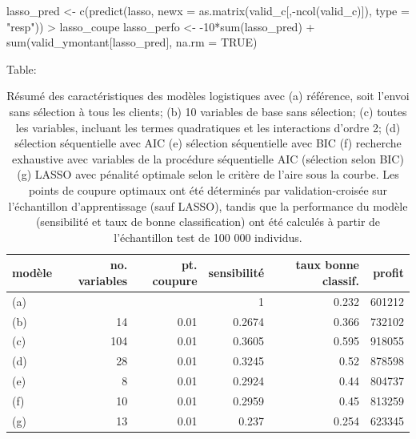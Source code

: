 \documentclass[
  11pt,
  letterpaper,
]{scrbook}
\newenvironment{Shaded}{\begin{snugshade}}{\end{snugshade}}
\newcommand{\AttributeTok}[1]{\textcolor[rgb]{0.40,0.45,0.13}{#1}}
\newcommand{\ConstantTok}[1]{\textcolor[rgb]{0.56,0.35,0.01}{#1}}
\newcommand{\DecValTok}[1]{\textcolor[rgb]{0.68,0.00,0.00}{#1}}
\newcommand{\FunctionTok}[1]{\textcolor[rgb]{0.28,0.35,0.67}{#1}}
\newcommand{\NormalTok}[1]{\textcolor[rgb]{0.00,0.23,0.31}{#1}}
\newcommand{\OtherTok}[1]{\textcolor[rgb]{0.00,0.23,0.31}{#1}}
\newcommand{\SpecialCharTok}[1]{\textcolor[rgb]{0.37,0.37,0.37}{#1}}
\newcommand{\StringTok}[1]{\textcolor[rgb]{0.13,0.47,0.30}{#1}}
\theoremstyle{definition}
\theoremstyle{remark}
\begin{document}
\begin{Shaded}
\begin{Highlighting}[]
\NormalTok{lasso\_pred }\OtherTok{\textless{}{-}} \FunctionTok{c}\NormalTok{(}\FunctionTok{predict}\NormalTok{(lasso, }
        \AttributeTok{newx =} \FunctionTok{as.matrix}\NormalTok{(valid\_c[,}\SpecialCharTok{{-}}\FunctionTok{ncol}\NormalTok{(valid\_c)]), }
        \AttributeTok{type =} \StringTok{"resp"}\NormalTok{)) }\SpecialCharTok{\textgreater{}}\NormalTok{ lasso\_coupe}
\NormalTok{lasso\_perfo }\OtherTok{\textless{}{-}} \SpecialCharTok{{-}}\DecValTok{10}\SpecialCharTok{*}\FunctionTok{sum}\NormalTok{(lasso\_pred) }\SpecialCharTok{+} 
  \FunctionTok{sum}\NormalTok{(valid\_ymontant[lasso\_pred], }\AttributeTok{na.rm =} \ConstantTok{TRUE}\NormalTok{)}
\end{Highlighting}
\end{Shaded}

Table:

\hypertarget{tbl-03-summarylog}{}
\begin{table}
\caption{\label{tbl-03-summarylog}Résumé des caractéristiques des modèles logistiques avec (a) référence,
soit l'envoi sans sélection à tous les clients; (b) 10 variables de base
sans sélection; (c) toutes les variables, incluant les termes
quadratiques et les interactions d'ordre 2; (d) sélection séquentielle
avec AIC (e) sélection séquentielle avec BIC (f) recherche exhaustive
avec variables de la procédure séquentielle AIC (sélection selon BIC)
(g) LASSO avec pénalité optimale selon le critère de l'aire sous la
courbe. Les points de coupure optimaux ont été déterminés par
validation-croisée sur l'échantillon d'apprentissage (sauf LASSO),
tandis que la performance du modèle (sensibilité et taux de bonne
classification) ont été calculés à partir de l'échantillon test de 100
000 individus. }\tabularnewline

\centering
\begin{tabular}{lrrrrr}
\toprule
modèle & no. variables & pt. coupure &  sensibilité & taux bonne classif. & profit\\
\midrule
(a) &  &  & 1 & 0.232 & 601212\\
(b) & 14 & 0.01 & 0.2674 & 0.366 & 732102\\
(c) & 104 & 0.01 & 0.3605 & 0.595 & 918055\\
(d) & 28 & 0.01 & 0.3245 & 0.52 & 878598\\
(e) & 8 & 0.01 & 0.2924 & 0.44 & 804737\\
\addlinespace
(f) & 10 & 0.01 & 0.2959 & 0.45 & 813259\\
(g) & 13 & 0.01 & 0.237 & 0.254 & 623345\\
\bottomrule
\end{tabular}
\end{table}
\end{document}
